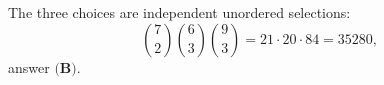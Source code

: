 The three choices are independent unordered selections:
\[\binom72\binom63\binom93=21\cdot20\cdot84=\boxed{35280},\]
answer $\textbf{(B)}$.
